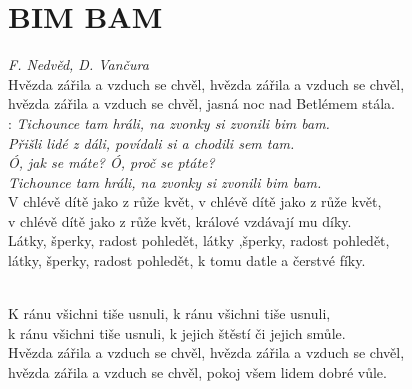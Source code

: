 \section*{\Huge BIM BAM}
\emph{F. Nedvěd, D. Vančura}\\


Hvězda zářila a vzduch se chvěl, hvězda zářila a vzduch se chvěl,\\
hvězda zářila a vzduch se chvěl, jasná noc nad Betlémem stála.\\

\textregistered:
\emph{
Tichounce tam hráli, na zvonky si zvonili bim bam.\\
Přišli lidé z dáli, povídali si a chodili sem tam.\\
Ó, jak se máte? Ó, proč se ptáte?\\
Tichounce tam hráli, na zvonky si zvonili bim bam.}\\


V chlévě dítě jako z růže květ, v chlévě dítě jako z růže květ,\\
v chlévě dítě jako z růže květ, králové vzdávají mu díky.\\

Látky, šperky, radost pohledět, látky ,šperky, radost pohledět,\\
látky, šperky, radost pohledět, k tomu datle a čerstvé fíky.

\textregistered\\

K ránu všichni tiše usnuli, k ránu všichni tiše usnuli,\\
k ránu všichni tiše usnuli, k jejich štěstí či jejich smůle.\\

Hvězda zářila a vzduch se chvěl, hvězda zářila a vzduch se chvěl,\\
hvězda zářila a vzduch se chvěl, pokoj všem lidem dobré vůle.

\textregistered

\newpage

